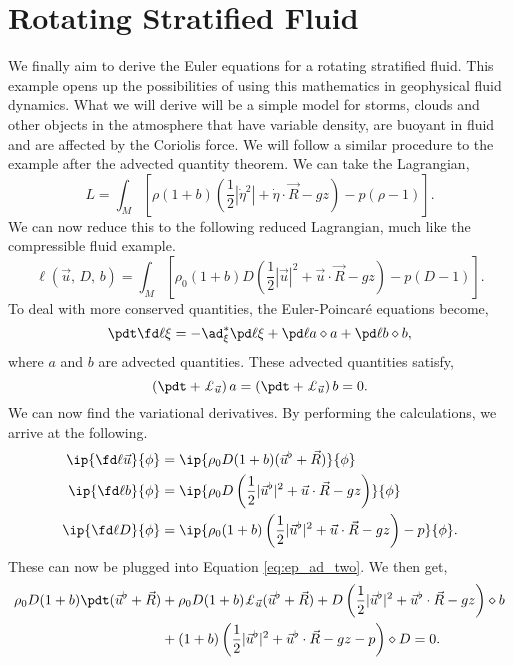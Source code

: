 
\section{Rotating Stratified Fluid}
We finally aim to derive the Euler equations for a rotating stratified fluid. This example opens up the possibilities of using this mathematics in geophysical fluid dynamics. What we will derive will be a simple model for storms, clouds and other objects in the atmosphere that have variable density, are buoyant in fluid and are affected by the Coriolis force. We will follow a similar procedure to the example after the advected quantity theorem. We can take the Lagrangian,
$$ L = \int_M \left[ \rho (1 + b)\left( \frac{1}{2}|\dot\eta^2| + \dot \eta \cdot \vec R - gz \right) - p(\rho - 1) \right]. $$
We can now reduce this to the following reduced Lagrangian, much like the compressible fluid example.
$$ \ell(\vec u,\, D,\, b) = \int_M \left[ \rho_0(1 + b)D \left( \frac{1}{2}|\vec u|^2 + \vec u \cdot \vec R - gz \right) - p(D-1) \right]. $$
To deal with more conserved quantities, the Euler-Poincar\'e equations become,
\begin{equation}
  \pdt \fd \ell \xi = -\ad^*_\xi \pd \ell \xi + \pd \ell a \diamond a + \pd \ell b \diamond b,\label{eq:ep_ad_two}
\end{equation}
where $a$ and $b$ are advected quantities. These advected quantities satisfy,
$$ \left( \pdt + \pounds_{\vec u} \right)a = \left( \pdt + \pounds_{\vec u} \right)b = 0. $$
\noindent
We can now find the variational derivatives. By performing the calculations, we arrive at the following.
\begin{align*}
  \ip{\fd \ell {\vec u}}{\phi} &= \ip{\rho_0 D (1 + b)(\vec u^\flat + \vec R )}{\phi} \\
  \ip{\fd \ell b}{\phi} &= \ip{\rho_0 D \left( \frac{1}{2}|\vec u^\flat|^2 + \vec u \cdot \vec R - gz \right)}{\phi} \\
  \ip{\fd \ell D}{\phi} &= \ip{\rho_0 (1+b) \left( \frac{1}{2}|\vec u^\flat|^2 + \vec u \cdot \vec R - gz \right) - p}{\phi}.
\end{align*}
These can now be plugged into Equation \eqref{eq:ep_ad_two}. We then get,
\begin{align*}
  \rho_0 D(1 + b)\pdt (\vec u^\flat + \vec R) &+ \rho_0 D(1 + b)\pounds_{\vec u} (\vec u^\flat + \vec R) + D\left(\frac{1}{2}|\vec u^\flat|^2 + \vec u^\flat \cdot \vec R - gz\right) \diamond b \\
  &+ (1+ b)\left(\frac{1}{2}|\vec u^\flat|^2 + \vec u^\flat \cdot \vec R - gz - p\right) \diamond D = 0.
\end{align*}
